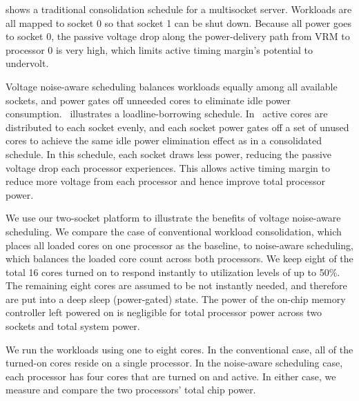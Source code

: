  shows a traditional consolidation schedule for a multisocket server. Workloads are all mapped to socket 0 so that socket 1 can be shut down. Because all power goes to socket 0, the passive voltage drop along the power-delivery path from VRM to processor 0 is very high, which limits active timing margin's potential to undervolt.

Voltage noise-aware scheduling balances workloads equally among all available sockets, and power gates off unneeded cores to eliminate idle power consumption.~ illustrates a loadline-borrowing schedule. In~ active cores are distributed to each socket evenly, and each socket power gates off a set of unused cores to achieve the same idle power elimination effect as in a consolidated schedule. In this schedule, each socket draws less power, reducing the passive voltage drop each processor experiences. This allows active timing margin to reduce more voltage from each processor and hence improve total processor power.

We use our two-socket platform to illustrate the benefits of voltage noise-aware scheduling. We compare the case of conventional workload consolidation, which places all loaded cores on one processor as the baseline, to noise-aware scheduling, which balances the loaded core count across both processors. We keep eight of the total 16 cores turned on to respond instantly to utilization levels of up to 50\%. The remaining eight cores are assumed to be not instantly needed, and therefore are put into a deep sleep (power-gated) state. The power of the on-chip memory controller left powered on is negligible for total processor power across two sockets and total system power.

We run the workloads using one to eight cores. In the conventional case, all of the turned-on cores reside on a single processor. In the noise-aware scheduling case, each processor has four cores that are turned on and active. In either case, we measure and compare the two processors' total chip power.

